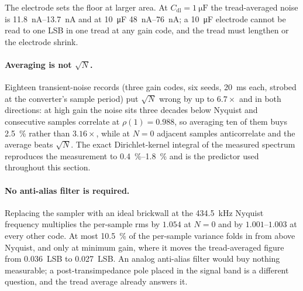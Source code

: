 The electrode sets the floor at larger area. At
\(C_{\mathrm{dl}} = \SI{1}{\micro\farad}\) the tread-averaged noise is
\SIrange{11.8}{13.7}{\nano\ampere} and at \SI{10}{\micro\farad}
\SIrange{48}{76}{\nano\ampere}; a \SI{10}{\micro\farad} electrode cannot be
read to one LSB in one tread at any gain code, and the tread must lengthen or
the electrode shrink.

\paragraph{Averaging is not \(\sqrt{N}\).} Eighteen transient-noise records
(three gain codes, six seeds, \SI{20}{\milli\second} each, strobed at the
converter's sample period) put \(\sqrt{N}\) wrong by up to \(6.7\times\) and
in both directions: at high gain the noise sits three decades below Nyquist and
consecutive samples correlate at \(\rho(1) = 0.988\), so averaging ten of them
buys \SI{2.5}{\percent} rather than \(3.16\times\), while at \(N = 0\)
adjacent samples anticorrelate and the average beats \(\sqrt{N}\). The exact
Dirichlet-kernel integral of the measured spectrum reproduces the measurement
to \SIrange{0.4}{1.8}{\percent} and is the predictor used throughout this
section.

\paragraph{No anti-alias filter is required.} Replacing the sampler with an
ideal brickwall at the \SI{434.5}{\kilo\hertz} Nyquist frequency multiplies the
per-sample rms by \(1.054\) at \(N = 0\) and by \(1.001\)--\(1.003\) at every
other code. At most \SI{10.5}{\percent} of the per-sample variance folds in
from above Nyquist, and only at minimum gain, where it moves the tread-averaged
figure from \SI{0.036}{LSB} to \SI{0.027}{LSB}. An analog anti-alias filter
would buy nothing measurable; a post-transimpedance pole placed in the signal
band is a different question, and the tread average already answers it.
